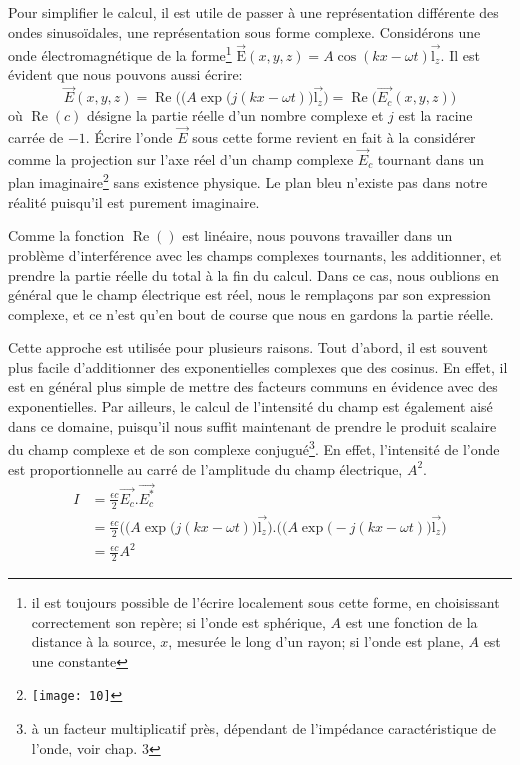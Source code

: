 Pour simplifier le calcul, il est utile de passer à une représentation différente des ondes sinusoïdales, une représentation sous forme complexe. Considérons une onde électromagnétique de la forme\footnote{il est toujours possible de l'écrire localement sous cette forme, en choisissant correctement son repère; si l'onde est sphérique, $A$ est une fonction de la distance à la source, $x$, mesurée le long d'un rayon; si l'onde est plane, $A$ est une constante} $\overset\rightarrow{\mbox{E}}(x,y,z)=A\cos(kx-\omega t)\overset\rightarrow{\mbox{l}_z}$. Il est évident que nous pouvons aussi écrire:
$$\overset\rightarrow{E}(x,y,z)=\operatorname{Re}\Big((A\exp\big(j(kx-\omega t)\big)\overset\rightarrow{\mbox{l}_z}\Big)=\operatorname{Re}\Big(\overset\rightarrow{E_c}(x,y,z)\Big)$$
où $\operatorname{Re}(c)$ désigne la partie réelle d'un nombre complexe et $j$ est la racine carrée de $-1$. Écrire l'onde $\overset\rightarrow{E}$ sous cette forme revient en fait à la considérer comme la projection sur l'axe réel d'un champ complexe $\overset\rightarrow{E}_c$ tournant dans un plan imaginaire\footnote{\texttt{[image: 10]}} sans existence physique. Le plan bleu n'existe pas dans notre réalité puisqu'il est purement imaginaire.

Comme la fonction $\operatorname{Re}()$ est linéaire, nous pouvons travailler dans un problème d'interférence avec les champs complexes tournants, les additionner, et prendre la partie réelle du total à la fin du calcul. Dans ce cas, nous oublions en général que le champ électrique est réel, nous le remplaçons par son expression complexe, et ce n'est qu'en bout de course que nous en gardons la partie réelle.

Cette approche est utilisée pour plusieurs raisons. Tout d'abord, il est souvent plus facile d'additionner des exponentielles complexes que des cosinus. En effet, il est en général plus simple de mettre des facteurs communs en évidence avec des exponentielles. Par ailleurs, le calcul de l'intensité du champ est également aisé dans ce domaine, puisqu'il nous suffit maintenant de prendre le produit scalaire du champ complexe et de son complexe conjugué\footnote{à un facteur multiplicatif près, dépendant de l'impédance caractéristique de l'onde, voir chap. 3}.
En effet, l'intensité de l'onde est proportionnelle au carré de l'amplitude du champ électrique, $A^2$.
\begin{align*}
I & = \frac{\epsilon c}{2}\overset\rightarrow{E_c}.\overset\rightarrow{E_c^*} \\
& = \frac{\epsilon c}{2}\Big((A\exp\big(j(kx-\omega t)\big)\overset\rightarrow{\mbox{l}_z}\Big).\Big((A\exp\big(-j(kx-\omega t)\big)\overset\rightarrow{\mbox{l}_z}\Big) \\
& = \frac{\epsilon c}{2}A^2
\end{align*}

